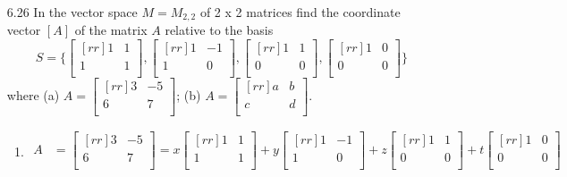\documentclass[12pt]{article}
\theoremstyle{definition}
\theoremstyle{plain}
\begin{document}
\begin{enumerate}
\item[6.26] In the vector space $M=M_{2,2}$ of 2 x 2 matrices find the coordinate vector $[A]$ of the matrix $A$ relative to the basis
\[ S=\{\begin{bmatrix}[rr]1&1\\1&1\\\end{bmatrix},\begin{bmatrix}[rr]1&-1\\1&0\\\end{bmatrix},\begin{bmatrix}[rr]1&1\\0&0\\\end{bmatrix},\begin{bmatrix}[rr]1&0\\0&0\\\end{bmatrix}\} \]
where (a) $A=\begin{bmatrix}[rr]3&-5\\6&7\\\end{bmatrix}$; (b) $A=\begin{bmatrix}[rr]a&b\\c&d\\\end{bmatrix}$.
	\begin{enumerate}
	\item
		\begin{align*}
		A&= \begin{bmatrix}[rr]3&-5\\6&7\\\end{bmatrix} = x\begin{bmatrix}[rr]1&1\\1&1\\\end{bmatrix}+y\begin{bmatrix}[rr]1&-1\\1&0\\\end{bmatrix}+z\begin{bmatrix}[rr]1&1\\0&0\\\end{bmatrix}+t\begin{bmatrix}[rr]1&0\\0&0\\\end{bmatrix}\\

\end{align*}
\end{enumerate}
\end{enumerate}
\end{document}
